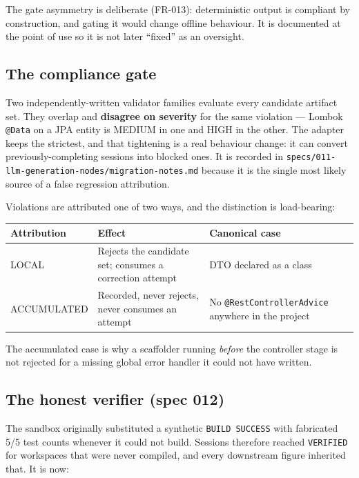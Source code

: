 \documentclass[11pt,a4paper]{article}
\begin{document}
The gate asymmetry is deliberate (FR-013): deterministic output is compliant by
construction, and gating it would change offline behaviour. It is documented at the
point of use so it is not later ``fixed'' as an oversight.

\subsection{The compliance gate}

Two independently-written validator families evaluate every candidate artifact set.
They overlap and \textbf{disagree on severity} for the same violation --- Lombok
\texttt{@Data} on a JPA entity is MEDIUM in one and HIGH in the other. The adapter
keeps the strictest, and that tightening is a real behaviour change: it can convert
previously-completing sessions into blocked ones. It is recorded in
\texttt{specs/011-llm-generation-nodes/migration-notes.md} because it is the single
most likely source of a false regression attribution.

Violations are attributed one of two ways, and the distinction is load-bearing:

\begin{center}
\begin{tabular}{@{}lll@{}}
\toprule
\textbf{Attribution} & \textbf{Effect} & \textbf{Canonical case} \\
\midrule
LOCAL & Rejects the candidate set; consumes a correction attempt &
DTO declared as a class \\
ACCUMULATED & Recorded, never rejects, never consumes an attempt &
No \texttt{@RestControllerAdvice} anywhere in the project \\
\bottomrule
\end{tabular}
\end{center}

The accumulated case is why a scaffolder running \emph{before} the controller stage
is not rejected for a missing global error handler it could not have written.

\subsection{The honest verifier (spec 012)}

The sandbox originally substituted a synthetic \texttt{BUILD SUCCESS} with
fabricated 5/5 test counts whenever it could not build. Sessions therefore reached
\texttt{VERIFIED} for workspaces that were never compiled, and every downstream
figure inherited that. It is now:
\end{document}

